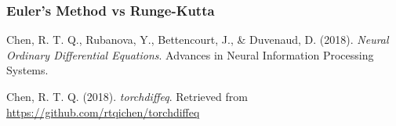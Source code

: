 \documentclass[11pt]{article}
\begin{document}
\subsubsection{Euler's Method vs Runge-Kutta}

\begin{thebibliography}{9}

    Chen, R. T. Q., Rubanova, Y., Bettencourt, J., \& Duvenaud, D. (2018).
    \textit{Neural Ordinary Differential Equations}.
    Advances in Neural Information Processing Systems.
  
    Chen, R. T. Q. (2018).
    \textit{torchdiffeq}.
    Retrieved from \url{https://github.com/rtqichen/torchdiffeq}
  
\end{thebibliography}



  
\end{document}
